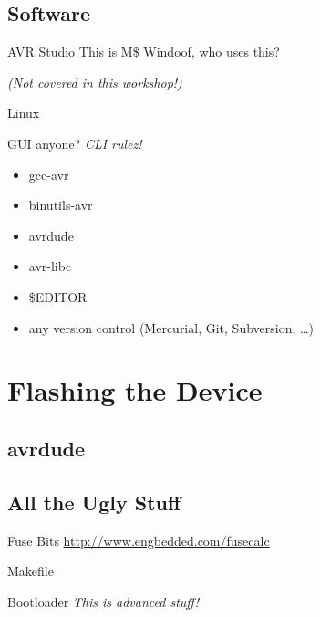 \documentclass{beamer}
\begin{document}
\subsection{Software}

\begin{frame}{AVR Studio}
    This is M\$ Windoof, who uses this?

    \pause

    \emph{(Not covered in this workshop!)}
\end{frame}

\begin{frame}{Linux}
    \begin{block}{GUI anyone?}
        \emph{CLI rulez!}
    \end{block}
    \begin{itemize}
        \item gcc-avr
        \item binutils-avr
        \item avrdude
        \item avr-libc
        \item \$EDITOR
        \item any version control (Mercurial, Git, Subversion, …)
    \end{itemize}
\end{frame}

\section{Flashing the Device}

\subsection{avrdude}

\subsection{All the Ugly Stuff}

\begin{frame}{Fuse Bits}
    \url{http://www.engbedded.com/fusecalc}
\end{frame}

\begin{frame}{Makefile}
\end{frame}

\begin{frame}{Bootloader}
    \emph{This is advanced stuff!}
\end{frame}
\end{document}
